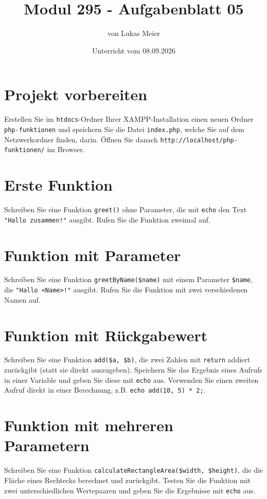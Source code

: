 \documentclass[a4paper,12pt]{article}
\title{Modul 295 - Aufgabenblatt 05}
\author{von Lukas Meier}
\date{Unterricht vom 08.09.2026}
\begin{document}
\maketitle

\section{Projekt vorbereiten}

Erstellen Sie im \texttt{htdocs}-Ordner Ihrer XAMPP-Installation einen neuen Ordner \texttt{php-funktionen} und speichern Sie die Datei \texttt{index.php}, welche Sie auf dem Netzwerkordner finden, darin. Öffnen Sie danach \texttt{http://localhost/php-funktionen/} im Browser.

\section{Erste Funktion}

Schreiben Sie eine Funktion \texttt{greet()} ohne Parameter, die mit \texttt{echo} den Text \texttt{"Hallo zusammen!"} ausgibt. Rufen Sie die Funktion zweimal auf.

\section{Funktion mit Parameter}

Schreiben Sie eine Funktion \texttt{greetByName(\$name)} mit einem Parameter \texttt{\$name}, die \texttt{"Hallo <Name>!"} ausgibt. Rufen Sie die Funktion mit zwei verschiedenen Namen auf.

\section{Funktion mit Rückgabewert}

Schreiben Sie eine Funktion \texttt{add(\$a, \$b)}, die zwei Zahlen mit \texttt{return} addiert zurückgibt (statt sie direkt auszugeben). Speichern Sie das Ergebnis eines Aufrufs in einer Variable und geben Sie diese mit \texttt{echo} aus. Verwenden Sie einen zweiten Aufruf direkt in einer Berechnung, z.B. \texttt{echo add(10, 5) * 2;}.

\section{Funktion mit mehreren Parametern}

Schreiben Sie eine Funktion \texttt{calculateRectangleArea(\$width, \$height)}, die die Fläche eines Rechtecks berechnet und zurückgibt. Testen Sie die Funktion mit zwei unterschiedlichen Wertepaaren und geben Sie die Ergebnisse mit \texttt{echo} aus.
\end{document}

